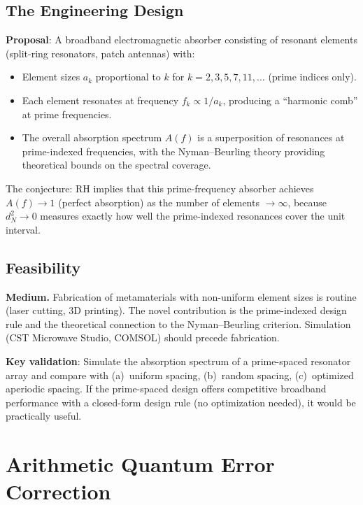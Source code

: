 \documentclass[11pt,a4paper]{article}
\begin{document}
\subsection{The Engineering Design}

\textbf{Proposal}: A broadband electromagnetic absorber consisting
of resonant elements (split-ring resonators, patch antennas) with:
\begin{itemize}
  \item Element sizes $a_k$ proportional to $k$ for
    $k = 2, 3, 5, 7, 11, \ldots$  (prime indices only).
  \item Each element resonates at frequency $f_k \propto 1/a_k$,
    producing a ``harmonic comb'' at prime frequencies.
  \item The overall absorption spectrum $A(f)$ is a superposition
    of resonances at prime-indexed frequencies, with the
    Nyman--Beurling theory providing theoretical bounds on the
    spectral coverage.
\end{itemize}

The conjecture: RH implies that this prime-frequency absorber
achieves $A(f) \to 1$ (perfect absorption) as the number of
elements $\to \infty$, because $d_N^2 \to 0$ measures exactly
how well the prime-indexed resonances cover the unit interval.

\subsection{Feasibility}

\textbf{Medium.} Fabrication of metamaterials with non-uniform
element sizes is routine (laser cutting, 3D printing). The novel
contribution is the prime-indexed design rule and the theoretical
connection to the Nyman--Beurling criterion. Simulation (CST
Microwave Studio, COMSOL) should precede fabrication.

\textbf{Key validation}: Simulate the absorption spectrum of a
prime-spaced resonator array and compare with (a)~uniform spacing,
(b)~random spacing, (c)~optimized aperiodic spacing. If the
prime-spaced design offers competitive broadband performance with
a closed-form design rule (no optimization needed), it would be
practically useful.

\section{Arithmetic Quantum Error Correction}
\label{sec:qec}
\end{document}
